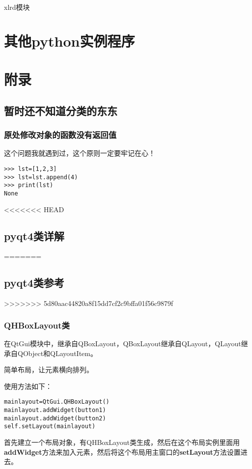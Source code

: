 \documentclass[12pt,oneside]{book}
\begin{document}
\begin{common-format}
xlrd模块


\part{其他python实例程序}



















\part{附录}
\chapter{暂时还不知道分类的东东}
\section{原处修改对象的函数没有返回值}
这个问题我就遇到过，这个原则一定要牢记在心！

\begin{Verbatim}
>>> lst=[1,2,3]
>>> lst=lst.append(4)
>>> print(lst)
None
\end{Verbatim}


<<<<<<< HEAD
\chapter{pyqt4类详解}
=======
\chapter{pyqt4类参考}
>>>>>>> 5d80aac44820a8f15dd7cf2c9bffa01f56c9879f


\section{QHBoxLayout类}
在QtGui模块中，继承自QBoxLayout，QBoxLayout继承自QLayout，QLayout继承自QObject和QLayoutItem。

简单布局，让元素横向排列。

使用方法如下：
\begin{Verbatim}
mainlayout=QtGui.QHBoxLayout()
mainlayout.addWidget(button1)
mainlayout.addWidget(button2)
self.setLayout(mainlayout)
\end{Verbatim}
首先建立一个布局对象，有QHBoxLayout类生成，然后在这个布局实例里面用\textbf{addWidget}方法来加入元素，然后将这个布局用主窗口的\textbf{setLayout}方法设置进去。


\end{common-format}
\end{document}
